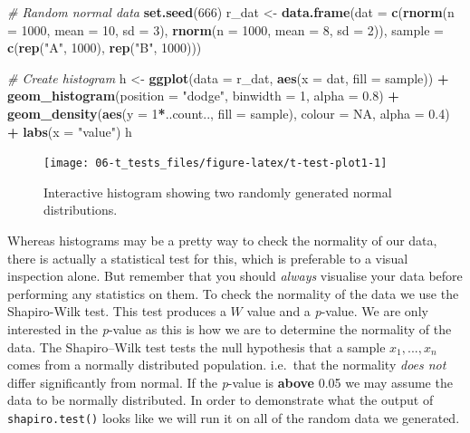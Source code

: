\documentclass[english,10pt,a4paper,oneside]{book}
\newenvironment{Shaded}{\begin{snugshade}}{\end{snugshade}}
\newcommand{\CommentTok}[1]{\textcolor[rgb]{0.56,0.35,0.01}{\textit{#1}}}
\newcommand{\DataTypeTok}[1]{\textcolor[rgb]{0.13,0.29,0.53}{#1}}
\newcommand{\DecValTok}[1]{\textcolor[rgb]{0.00,0.00,0.81}{#1}}
\newcommand{\FloatTok}[1]{\textcolor[rgb]{0.00,0.00,0.81}{#1}}
\newcommand{\KeywordTok}[1]{\textcolor[rgb]{0.13,0.29,0.53}{\textbf{#1}}}
\newcommand{\NormalTok}[1]{#1}
\newcommand{\OperatorTok}[1]{\textcolor[rgb]{0.81,0.36,0.00}{\textbf{#1}}}
\newcommand{\OtherTok}[1]{\textcolor[rgb]{0.56,0.35,0.01}{#1}}
\newcommand{\StringTok}[1]{\textcolor[rgb]{0.31,0.60,0.02}{#1}}
\theoremstyle{definition}
\theoremstyle{definition}
\theoremstyle{definition}
\theoremstyle{remark}
\begin{document}
\begin{Shaded}
\begin{Highlighting}[]
\CommentTok{# Random normal data}
\KeywordTok{set.seed}\NormalTok{(}\DecValTok{666}\NormalTok{)}
\NormalTok{r_dat <-}\StringTok{ }\KeywordTok{data.frame}\NormalTok{(}\DataTypeTok{dat =} \KeywordTok{c}\NormalTok{(}\KeywordTok{rnorm}\NormalTok{(}\DataTypeTok{n =} \DecValTok{1000}\NormalTok{, }\DataTypeTok{mean =} \DecValTok{10}\NormalTok{, }\DataTypeTok{sd =} \DecValTok{3}\NormalTok{),}
                            \KeywordTok{rnorm}\NormalTok{(}\DataTypeTok{n =} \DecValTok{1000}\NormalTok{, }\DataTypeTok{mean =} \DecValTok{8}\NormalTok{, }\DataTypeTok{sd =} \DecValTok{2}\NormalTok{)),}
                    \DataTypeTok{sample =} \KeywordTok{c}\NormalTok{(}\KeywordTok{rep}\NormalTok{(}\StringTok{"A"}\NormalTok{, }\DecValTok{1000}\NormalTok{), }\KeywordTok{rep}\NormalTok{(}\StringTok{"B"}\NormalTok{, }\DecValTok{1000}\NormalTok{)))}

\CommentTok{# Create histogram}
\NormalTok{h <-}\StringTok{ }\KeywordTok{ggplot}\NormalTok{(}\DataTypeTok{data =}\NormalTok{ r_dat, }\KeywordTok{aes}\NormalTok{(}\DataTypeTok{x =}\NormalTok{ dat, }\DataTypeTok{fill =}\NormalTok{ sample)) }\OperatorTok{+}
\StringTok{  }\KeywordTok{geom_histogram}\NormalTok{(}\DataTypeTok{position =} \StringTok{"dodge"}\NormalTok{, }\DataTypeTok{binwidth =} \DecValTok{1}\NormalTok{, }\DataTypeTok{alpha =} \FloatTok{0.8}\NormalTok{) }\OperatorTok{+}
\StringTok{  }\KeywordTok{geom_density}\NormalTok{(}\KeywordTok{aes}\NormalTok{(}\DataTypeTok{y =} \DecValTok{1}\OperatorTok{*}\NormalTok{..count.., }\DataTypeTok{fill =}\NormalTok{ sample), }\DataTypeTok{colour =} \OtherTok{NA}\NormalTok{, }\DataTypeTok{alpha =} \FloatTok{0.4}\NormalTok{) }\OperatorTok{+}
\StringTok{  }\KeywordTok{labs}\NormalTok{(}\DataTypeTok{x =} \StringTok{"value"}\NormalTok{)}
\NormalTok{h}
\end{Highlighting}
\end{Shaded}

\begin{figure}
\texttt{[image: 06-t\_tests\_files/figure-latex/t-test-plot1-1]} \caption{Interactive histogram showing two randomly generated normal distributions.}\label{fig:t-test-plot1}
\end{figure}

Whereas histograms may be a pretty way to check the normality of our
data, there is actually a statistical test for this, which is preferable
to a visual inspection alone. But remember that you should \emph{always}
visualise your data before performing any statistics on them. To check
the normality of the data we use the Shapiro-Wilk test. This test
produces a \(W\) value and a \emph{p}-value. We are only interested in
the \emph{p}-value as this is how we are to determine the normality of
the data. The Shapiro--Wilk test tests the null hypothesis that a sample
\(x_{1},..., x_{n}\) comes from a normally distributed population.
i.e.~that the normality \emph{does not} differ significantly from
normal. If the \emph{p}-value is \textbf{above} 0.05 we may assume the
data to be normally distributed. In order to demonstrate what the output
of \texttt{shapiro.test()} looks like we will run it on all of the
random data we generated.
\end{document}
